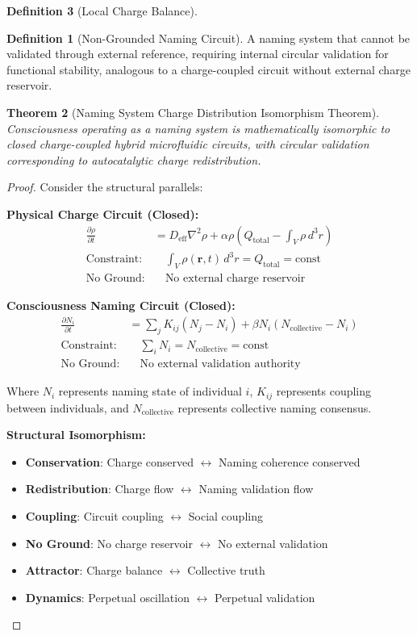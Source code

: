 \documentclass[12pt,a4paper]{article}
\theoremstyle{plain}
\newtheorem{theorem}{Theorem}[section]
\theoremstyle{definition}
\newtheorem{definition}[theorem]{Definition}
\theoremstyle{remark}
\begin{document}
\begin{definition}[Local Charge Balance]
\begin{definition}[Non-Grounded Naming Circuit]
A naming system that cannot be validated through external reference, requiring internal circular validation for functional stability, analogous to a charge-coupled circuit without external charge reservoir.
\end{definition}

\begin{theorem}[Naming System Charge Distribution Isomorphism Theorem]
Consciousness operating as a naming system is mathematically isomorphic to closed charge-coupled hybrid microfluidic circuits, with circular validation corresponding to autocatalytic charge redistribution.
\end{theorem}

\begin{proof}
Consider the structural parallels:

\textbf{Physical Charge Circuit (Closed):}
\begin{align}
\frac{\partial \rho}{\partial t} &= D_{\text{eff}} \nabla^2 \rho + \alpha \rho \left(Q_{\text{total}} - \int_V \rho \, d^3r\right) \\
\text{Constraint:} &\quad \int_V \rho(\mathbf{r},t) \, d^3r = Q_{\text{total}} = \text{const} \\
\text{No Ground:} &\quad \text{No external charge reservoir}
\end{align}

\textbf{Consciousness Naming Circuit (Closed):}
\begin{align}
\frac{\partial N_i}{\partial t} &= \sum_j K_{ij} (N_j - N_i) + \beta N_i \left(N_{\text{collective}} - N_i\right) \\
\text{Constraint:} &\quad \sum_i N_i = N_{\text{collective}} = \text{const} \\
\text{No Ground:} &\quad \text{No external validation authority}
\end{align}

Where $N_i$ represents naming state of individual $i$, $K_{ij}$ represents coupling between individuals, and $N_{\text{collective}}$ represents collective naming consensus.

\textbf{Structural Isomorphism:}
\begin{itemize}
\item \textbf{Conservation}: Charge conserved $\leftrightarrow$ Naming coherence conserved
\item \textbf{Redistribution}: Charge flow $\leftrightarrow$ Naming validation flow
\item \textbf{Coupling}: Circuit coupling $\leftrightarrow$ Social coupling
\item \textbf{No Ground}: No charge reservoir $\leftrightarrow$ No external validation
\item \textbf{Attractor}: Charge balance $\leftrightarrow$ Collective truth
\item \textbf{Dynamics}: Perpetual oscillation $\leftrightarrow$ Perpetual validation
\end{itemize}


\end{proof}
\end{definition}
\end{document}
